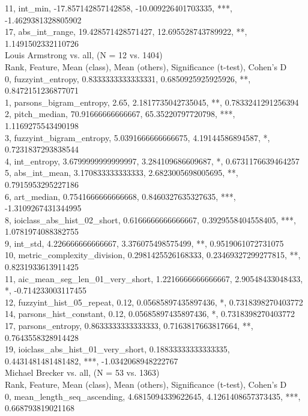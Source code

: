 11, int_min, -17.857142857142858, -10.009226401703335, ***, -1.4629381328805902\\
17, abs_int_range, 19.428571428571427, 12.695528743789922, **, 1.1491502332110726\\
Louis Armstrong vs. all, (N = 12 vs. 1404)\\
Rank, Feature, Mean (class), Mean (others), Significance (t-test), Cohen's D\\
0, fuzzyint_entropy, 0.8333333333333331, 0.6850925925925926, **, 0.8472151236877071\\
1, parsons_bigram_entropy, 2.65, 2.1817735042735045, **, 0.7833241291256394\\
2, pitch_median, 70.91666666666667, 65.35220797720798, ***, 1.1169275543490198\\
3, fuzzyint_bigram_entropy, 5.0391666666666675, 4.19144586894587, *, 0.7231837293838544\\
4, int_entropy, 3.6799999999999997, 3.284109686609687, *, 0.6731176639464257\\
5, abs_int_mean, 3.170833333333333, 2.6823005698005695, **, 0.7915953295227186\\
6, art_median, 0.7541666666666668, 0.8460327635327635, ***, -1.3109267431344995\\
8, ioiclass_abs_hist_02_short, 0.6166666666666667, 0.3929558404558405, ***, 1.0781974088382755\\
9, int_std, 4.226666666666667, 3.376075498575499, **, 0.9519061072731075\\
10, metric_complexity_division, 0.2981425526168333, 0.23469327299277815, **, 0.8231933613911425\\
11, aic_mean_seg_len_01_very_short, 1.2216666666666667, 2.90548433048433, *, -0.714233003117455\\
12, fuzzyint_hist_05_repeat, 0.12, 0.05685897435897436, *, 0.7318398270403772\\
14, parsons_hist_constant, 0.12, 0.05685897435897436, *, 0.7318398270403772\\
17, parsons_entropy, 0.8633333333333333, 0.7163817663817664, **, 0.7643558328914428\\
19, ioiclass_abs_hist_01_very_short, 0.18833333333333335, 0.4431481481481482, ***, -1.0342068948222767\\
Michael Brecker vs. all, (N = 53 vs. 1363)\\
Rank, Feature, Mean (class), Mean (others), Significance (t-test), Cohen's D\\
0, mean_length_seq_ascending, 4.6815094339622645, 4.1261408657373435, ***, 0.668793819021168\\
